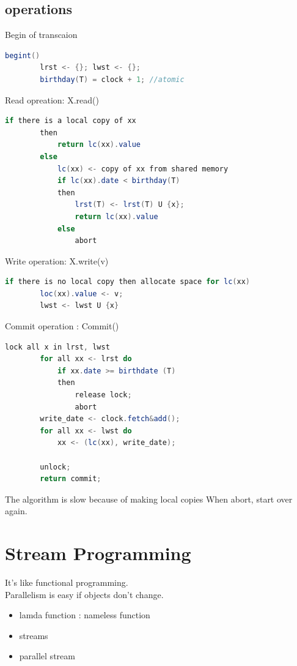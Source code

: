 \documentclass[twoside]{article}
\begin{document}
	\subsection {operations}

	Begin of transcaion
	\begin{center}
		\begin{lstlisting}[language=Java]
		begint()
		lrst <- {}; lwst <- {};
		birthday(T) = clock + 1; //atomic
		\end{lstlisting}
	\end{center}

	Read opreation: X.read()
	\begin{center}
		\begin{lstlisting}[language=Java]
		if there is a local copy of xx
		then 
			return lc(xx).value
		else
			lc(xx) <- copy of xx from shared memory
			if lc(xx).date < birthday(T)
			then 
				lrst(T) <- lrst(T) U {x};
				return lc(xx).value
			else
				abort
		\end{lstlisting}
	\end{center}

	Write operation: X.write(v)
	\begin{center}
		\begin{lstlisting}[language=Java]
		if there is no local copy then allocate space for lc(xx)
		loc(xx).value <- v;
		lwst <- lwst U {x}
		\end{lstlisting}
	\end{center}

	Commit operation : Commit()
	\begin{center}
		\begin{lstlisting}[language=Java]
		lock all x in lrst, lwst
		for all xx <- lrst do
			if xx.date >= birthdate (T)
			then 
				release lock;
				abort
		write_date <- clock.fetch&add();
		for all xx <- lwst do
			xx <- (lc(xx), write_date);

		unlock;
		return commit;
		\end{lstlisting}
	\end{center}

	The algorithm is slow because of making local copies
	When abort, start over again.

	\section{Stream Programming}

	It's like functional programming.\\
	Parallelism is easy if objects don't change.
	\begin{itemize}
		\item lamda function : nameless function
		\item streams
		\item parallel stream
	\end{itemize}
\end{document}
